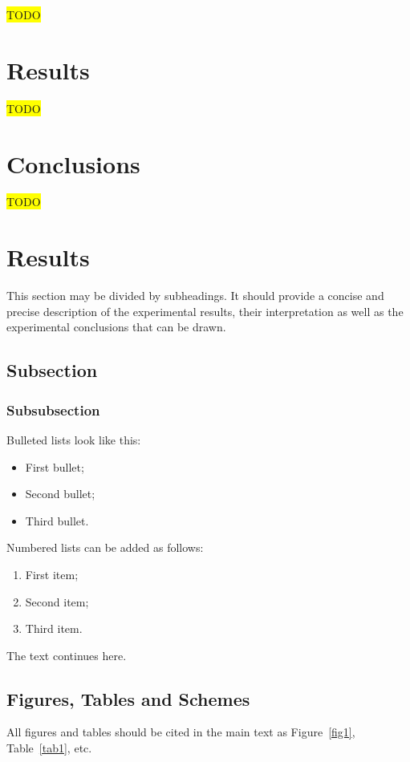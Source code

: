 \documentclass[journal,article,submit,pdftex,moreauthors]{Definitions/mdpi}
\begin{document}
\colorbox{yellow}{TODO}

\section{Results}
\colorbox{yellow}{TODO}

\section{Conclusions}
\colorbox{yellow}{TODO}


\section{Results}

This section may be divided by subheadings. It should provide a concise and precise description of the experimental results, their interpretation as well as the experimental conclusions that can be drawn.
\subsection{Subsection}
\subsubsection{Subsubsection}

Bulleted lists look like this:
\begin{itemize}
\item	First bullet;
\item	Second bullet;
\item	Third bullet.
\end{itemize}

Numbered lists can be added as follows:
\begin{enumerate}
\item	First item; 
\item	Second item;
\item	Third item.
\end{enumerate}

The text continues here. 

\subsection{Figures, Tables and Schemes}

All figures and tables should be cited in the main text as Figure~\ref{fig1}, Table~\ref{tab1}, etc.
\end{document}
